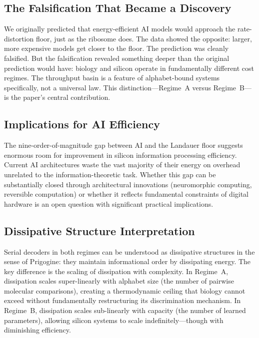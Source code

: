 \documentclass[11pt]{article}
\begin{document}
\subsection{The Falsification That Became a Discovery}

We originally predicted that energy-efficient AI models would approach the rate-distortion floor, just as the ribosome does. The data showed the opposite: larger, more expensive models get closer to the floor. The prediction was cleanly falsified. But the falsification revealed something deeper than the original prediction would have: biology and silicon operate in fundamentally different cost regimes. The throughput basin is a feature of alphabet-bound systems specifically, not a universal law. This distinction---Regime~A versus Regime~B---is the paper's central contribution.

\subsection{Implications for AI Efficiency}

The nine-order-of-magnitude gap between AI and the Landauer floor suggests enormous room for improvement in silicon information processing efficiency. Current AI architectures waste the vast majority of their energy on overhead unrelated to the information-theoretic task. Whether this gap can be substantially closed through architectural innovations (neuromorphic computing, reversible computation) or whether it reflects fundamental constraints of digital hardware is an open question with significant practical implications.

\subsection{Dissipative Structure Interpretation}

Serial decoders in both regimes can be understood as dissipative structures in the sense of Prigogine: they maintain informational order by dissipating energy. The key difference is the scaling of dissipation with complexity. In Regime~A, dissipation scales super-linearly with alphabet size (the number of pairwise molecular comparisons), creating a thermodynamic ceiling that biology cannot exceed without fundamentally restructuring its discrimination mechanism. In Regime~B, dissipation scales sub-linearly with capacity (the number of learned parameters), allowing silicon systems to scale indefinitely---though with diminishing efficiency.
\end{document}
